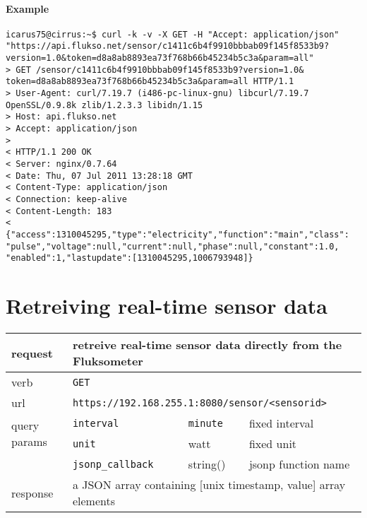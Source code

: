 \paragraph{Example}
\begin{Verbatim}
icarus75@cirrus:~$ curl -k -v -X GET -H "Accept: application/json"
"https://api.flukso.net/sensor/c1411c6b4f9910bbbab09f145f8533b9?
version=1.0&token=d8a8ab8893ea73f768b66b45234b5c3a&param=all"
> GET /sensor/c1411c6b4f9910bbbab09f145f8533b9?version=1.0&
token=d8a8ab8893ea73f768b66b45234b5c3a&param=all HTTP/1.1
> User-Agent: curl/7.19.7 (i486-pc-linux-gnu) libcurl/7.19.7
OpenSSL/0.9.8k zlib/1.2.3.3 libidn/1.15
> Host: api.flukso.net
> Accept: application/json
> 
< HTTP/1.1 200 OK
< Server: nginx/0.7.64
< Date: Thu, 07 Jul 2011 13:28:18 GMT
< Content-Type: application/json
< Connection: keep-alive
< Content-Length: 183
< 
{"access":1310045295,"type":"electricity","function":"main","class":
"pulse","voltage":null,"current":null,"phase":null,"constant":1.0,
"enabled":1,"lastupdate":[1310045295,1006793948]}
\end{Verbatim}

\section{Retreiving real-time sensor data}
\begin{tabular}{|l|l|l|p{5cm}|}

\hline
request & \multicolumn{3}{|l|}{retreive real-time sensor data directly from the Fluksometer} \\

\hline
verb & \multicolumn{3}{|l|}{\texttt{GET}} \\

\hline
url & \multicolumn{3}{|l|}{\texttt{https://192.168.255.1:8080/sensor/\textless sensorid\textgreater}} \\

\hline
\multirow{2}{*}{query params} & \texttt{interval} & \texttt{minute} & fixed interval \\
& \texttt{unit} & watt & fixed unit \\
& \texttt{{\small jsonp\_callback}} & string() & jsonp function name \\

\hline
response & \multicolumn{3}{|l|}{a JSON array containing [unix timestamp, value] array elements} \\

\hline

\end{tabular}

